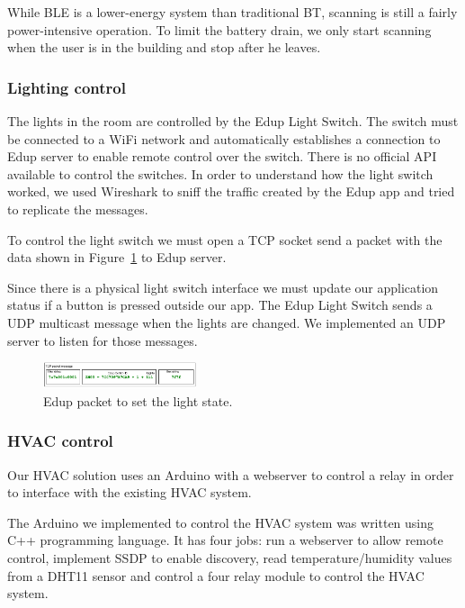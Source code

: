 \documentclass[conference]{IEEEtran}
\begin{document}
While \ac{BLE} is a lower-energy system than traditional \ac{BT}, scanning is still a fairly power-intensive operation. To limit the battery drain, we only start scanning when the user is in the building and stop after he leaves.

\subsubsection{Lighting control}\label{light_imp}


The lights in the room are controlled by the Edup Light Switch. The switch must be connected to a WiFi network and automatically establishes a connection to Edup server to enable remote control over the switch. There is no official \ac{API} available to control the switches. In order to understand how the light switch worked, we used Wireshark to sniff the traffic created by the Edup app and tried to replicate the messages.

To control the light switch we must open a \ac{TCP} socket send a packet with the data shown in Figure~\ref{edup_imp} to Edup server.

Since there is a physical light switch interface we must update our application status if a button is pressed outside our app.
The Edup Light Switch sends a \ac{UDP} multicast message when the lights are changed. We implemented an \ac{UDP} server to listen for those messages. 



\begin{figure}[h]
\centering
\includegraphics[width=0.4\textwidth]{Figures/Edup_imp}
\caption{Edup packet to set the light state.}
\label{edup_imp}
\end{figure}




\subsubsection{HVAC control}

Our HVAC solution uses an Arduino with a webserver to control a relay in order to interface with the existing HVAC system.

The Arduino we implemented to control the HVAC system was written using C++ programming language. It has four jobs: run a webserver to allow remote control, implement \ac{SSDP} to enable discovery, read temperature/humidity values from a DHT11 sensor and control a four relay module to control the HVAC system.
\end{document}
